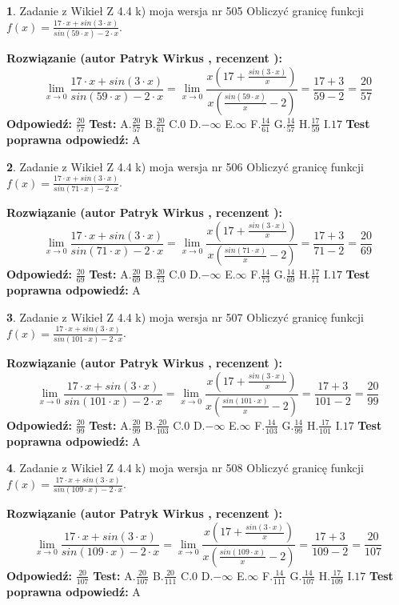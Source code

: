 \documentclass[12pt, a4paper]{article}
\theoremstyle{definition} %
\newtheorem{zad}{}
\newcommand{\zadStart}[1]{\begin{zad}#1\newline}
\newcommand{\zadStop}{\end{zad}}
\newcommand{\rozwStart}[2]{\noindent \textbf{Rozwiązanie (autor #1 , recenzent #2): }\newline}
\newcommand{\rozwStop}{\newline}
\newcommand{\odpStart}{\noindent \textbf{Odpowiedź:}\newline}
\newcommand{\odpStop}{\newline}
\newcommand{\testStart}{\noindent \textbf{Test:}\newline}
\newcommand{\testStop}{\newline}
\newcommand{\kluczStart}{\noindent \textbf{Test poprawna odpowiedź:}\newline}
\newcommand{\kluczStop}{\newline}
\begin{document}
\zadStart{Zadanie z Wikieł Z 4.4 k) moja wersja nr 505}
Obliczyć granicę funkcji $f(x)=\frac{17\cdot x +sin(3\cdot x)}{sin(59\cdot x) -2\cdot x}$.
\zadStop
\rozwStart{Patryk Wirkus}{}
$$\lim\limits_{x\to 0}\frac{17\cdot x +sin(3\cdot x)}{sin(59\cdot x) -2\cdot x}
=\lim\limits_{x\to 0}\frac{x(17+\frac{sin(3\cdot x)}{x})}{x(\frac{sin(59\cdot x)}{x}-2)}
=\frac{17+3}{59-2} = \frac{20}{57}$$
\rozwStop
\odpStart
$\frac{20}{57}$
\odpStop
\testStart
A.$\frac{20}{57}$
B.$\frac{20}{61}$
C.$0$
D.$-\infty$
E.$\infty$
F.$\frac{14}{61}$
G.$\frac{14}{57}$
H.$\frac{17}{59}$
I.$17$
\testStop
\kluczStart
A
\kluczStop



\zadStart{Zadanie z Wikieł Z 4.4 k) moja wersja nr 506}
Obliczyć granicę funkcji $f(x)=\frac{17\cdot x +sin(3\cdot x)}{sin(71\cdot x) -2\cdot x}$.
\zadStop
\rozwStart{Patryk Wirkus}{}
$$\lim\limits_{x\to 0}\frac{17\cdot x +sin(3\cdot x)}{sin(71\cdot x) -2\cdot x}
=\lim\limits_{x\to 0}\frac{x(17+\frac{sin(3\cdot x)}{x})}{x(\frac{sin(71\cdot x)}{x}-2)}
=\frac{17+3}{71-2} = \frac{20}{69}$$
\rozwStop
\odpStart
$\frac{20}{69}$
\odpStop
\testStart
A.$\frac{20}{69}$
B.$\frac{20}{73}$
C.$0$
D.$-\infty$
E.$\infty$
F.$\frac{14}{73}$
G.$\frac{14}{69}$
H.$\frac{17}{71}$
I.$17$
\testStop
\kluczStart
A
\kluczStop



\zadStart{Zadanie z Wikieł Z 4.4 k) moja wersja nr 507}
Obliczyć granicę funkcji $f(x)=\frac{17\cdot x +sin(3\cdot x)}{sin(101\cdot x) -2\cdot x}$.
\zadStop
\rozwStart{Patryk Wirkus}{}
$$\lim\limits_{x\to 0}\frac{17\cdot x +sin(3\cdot x)}{sin(101\cdot x) -2\cdot x}
=\lim\limits_{x\to 0}\frac{x(17+\frac{sin(3\cdot x)}{x})}{x(\frac{sin(101\cdot x)}{x}-2)}
=\frac{17+3}{101-2} = \frac{20}{99}$$
\rozwStop
\odpStart
$\frac{20}{99}$
\odpStop
\testStart
A.$\frac{20}{99}$
B.$\frac{20}{103}$
C.$0$
D.$-\infty$
E.$\infty$
F.$\frac{14}{103}$
G.$\frac{14}{99}$
H.$\frac{17}{101}$
I.$17$
\testStop
\kluczStart
A
\kluczStop



\zadStart{Zadanie z Wikieł Z 4.4 k) moja wersja nr 508}
Obliczyć granicę funkcji $f(x)=\frac{17\cdot x +sin(3\cdot x)}{sin(109\cdot x) -2\cdot x}$.
\zadStop
\rozwStart{Patryk Wirkus}{}
$$\lim\limits_{x\to 0}\frac{17\cdot x +sin(3\cdot x)}{sin(109\cdot x) -2\cdot x}
=\lim\limits_{x\to 0}\frac{x(17+\frac{sin(3\cdot x)}{x})}{x(\frac{sin(109\cdot x)}{x}-2)}
=\frac{17+3}{109-2} = \frac{20}{107}$$
\rozwStop
\odpStart
$\frac{20}{107}$
\odpStop
\testStart
A.$\frac{20}{107}$
B.$\frac{20}{111}$
C.$0$
D.$-\infty$
E.$\infty$
F.$\frac{14}{111}$
G.$\frac{14}{107}$
H.$\frac{17}{109}$
I.$17$
\testStop
\kluczStart
A
\kluczStop
\end{document}
